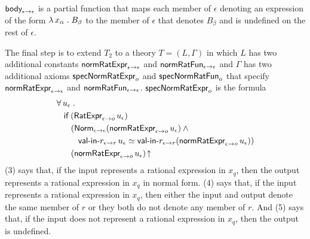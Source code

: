 \documentclass[fleqn]{llncs}
\begin{document}
  \item $\mbox{\sf body}_{\epsilon \rightarrow \epsilon}$ is a partial
    function that maps each member of $\epsilon$ denoting an
    expression of the form $\lambda\, x_\alpha \mathrel. B_\beta$ to the
    member of $\epsilon$ that denotes $B_\beta$ and is undefined on
    the rest of $\epsilon$.

\ee

\bsp The final step is to extend $T_2$ to a theory $T = (L,\Gamma)$ in
which $L$ has two additional constants $\mbox{\sf normRatExpr}_{\epsilon
  \rightarrow \epsilon}$ and $\mbox{\sf normRatFun}_{\epsilon \rightarrow
  \epsilon}$ and $\Gamma$ has two additional axioms
$\mbox{\sf specNormRatExpr}_o$ and $\mbox{\sf specNormRatFun}_o$ that
specify $\mbox{\sf normRatExpr}_{\epsilon \rightarrow \epsilon}$ and
$\mbox{\sf normRatFun}_{\epsilon \rightarrow
  \epsilon}$. $\mbox{\sf specNormRatExpr}_o$ is the formula\esp
\begin{align}
&
\forall\, u_\epsilon \mathrel.\\
& \hspace*{2ex}
\mbox{\sf if} \; (\mbox{\sf RatExpr}_{\epsilon \rightarrow o} \, u_\epsilon)\\
& \hspace*{4ex}
(\mbox{\sf Norm}_{\epsilon \rightarrow \epsilon}(\mbox{\sf normRatExpr}_{\epsilon \rightarrow o} \, u_\epsilon) \wedge {}\\
& \hspace*{6ex}
\mbox{\sf val-in-}r_{\epsilon \rightarrow r} \, u_\epsilon \simeq
\mbox{\sf val-in-}r_{\epsilon \rightarrow r}(\mbox{\sf normRatExpr}_{\epsilon \rightarrow o} \, u_\epsilon))\\
& \hspace*{4ex}
(\mbox{\sf normRatExpr}_{\epsilon \rightarrow o} \, u_\epsilon)\!\uparrow
\end{align}
(3) says that, if the input represents a rational expression in $x_q$,
then the output represents a rational expression in $x_q$ in normal
form.  (4) says that, if the input represents a rational expression in
$x_q$, then either the input and output denote the same member of $r$
or they both do not denote any member of $r$.  And (5) says that, if
the input does not represent a rational expression in $x_q$, then the
output is undefined.
\end{document}
